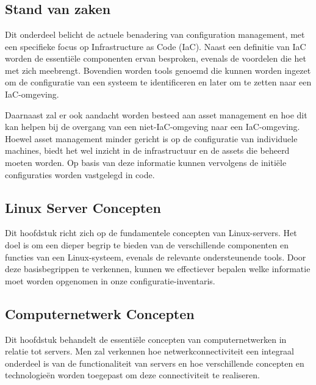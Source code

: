 
\chapter{}%
\label{ch:methodologie}

\section{Stand van zaken}
\label{sec:stand-van-zaken}
Dit onderdeel belicht de actuele benadering van configuration management, met een specifieke focus op Infrastructure as Code (IaC).
Naast een definitie van IaC worden de essenti\"ele componenten ervan besproken, evenals de voordelen die het met zich meebrengt.
Bovendien worden tools genoemd die kunnen worden ingezet om de configuratie van een systeem te identificeren en later om te zetten naar een IaC-omgeving.

Daarnaast zal er ook aandacht worden besteed aan asset management en hoe dit kan helpen bij de overgang van een niet-IaC-omgeving naar een IaC-omgeving.
Hoewel asset management minder gericht is op de configuratie van individuele machines, biedt het wel inzicht in de infrastructuur en de assets die beheerd moeten worden.
Op basis van deze informatie kunnen vervolgens de initi\"ele configuraties worden vastgelegd in code.

\section{Linux Server Concepten}
\label{sec:linux-server-concepten}
Dit hoofdstuk richt zich op de fundamentele concepten van Linux-servers.
Het doel is om een dieper begrip te bieden van de verschillende componenten en functies van een Linux-systeem, evenals de relevante ondersteunende tools.
Door deze basisbegrippen te verkennen, kunnen we effectiever bepalen welke informatie moet worden opgenomen in onze configuratie-inventaris.

\section{Computernetwerk Concepten}
\label{sec:computernetwerk-concepten}
Dit hoofdstuk behandelt de essenti\"ele concepten van computernetwerken in relatie tot servers.
Men zal verkennen hoe netwerkconnectiviteit een integraal onderdeel is van de functionaliteit van servers en hoe verschillende concepten en technologie\"en worden toegepast om deze connectiviteit te realiseren.

